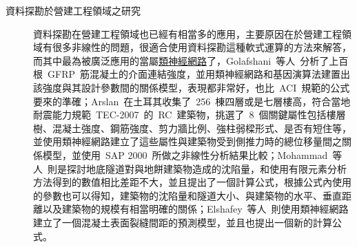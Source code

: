 \begin{description}

  \item[資料探勘於營建工程領域之研究]
  資料探勘在營建工程領域也已經有相當多的應用，主要原因在於營建工程領域有很多非線性的問題，很適合使用資料探勘這種軟式運算的方法來解答，而其中最為被廣泛應用的當屬\underline{類神經網路}了，Golafshani~等人\cite{golafshani2014artificial}~分析了上百根~GFRP~筋混凝土的介面連結強度，並用類神經網路和基因演算法建置出該強度與其設計參數間的關係模型，表現都非常好，也比~ACI\cite{aci2006guide}~規範的公式要來的準確；Arslan\cite{arslan2010evaluation}~在土耳其收集了~256~棟四層或是七層樓高，符合當地耐震能力規範~TEC-2007~的~RC~建築物，挑選了~8~個關鍵屬性包括樓層樹、混凝土強度、鋼筋強度、剪力牆比例、強柱弱樑形式、是否有短住等，並使用類神經網路建立了這些屬性與建築物受到側推力時的總位移量間之關係模型，並使用~SAP 2000~所做之非線性分析結果比較；Mohammad~等人\cite{azadi2013assessment}~則是探討地底隧道對與地餅建築物造成的沈陷量，和使用有限元素分析方法得到的數值相比差距不大，並且提出了一個計算公式，根據公式內使用的參數也可以得知，建築物的沈陷量和隧道大小、與建築物的水平、垂直距離以及建築物的規模有相當明確的關係；Elshafey~等人\cite{elshafey2013predicting}~則使用類神經網路建立了一個混凝土表面裂縫間距的預測模型，並且也提出一個新的計算公式。


\end{description}
